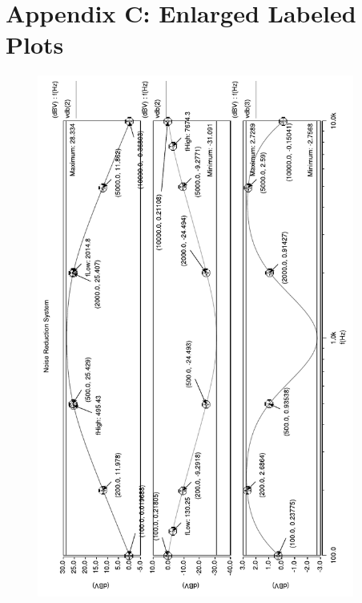\documentclass[report]{IEEEtran}
\begin{document}
		\section*{Appendix C: Enlarged Labeled Plots}
			\begin{figure}[h!]
				\begin{center}
					\includegraphics[width=\textwidth,height=650px]{nrs_whole}
				\end{center}
			\end{figure}
\end{document}
